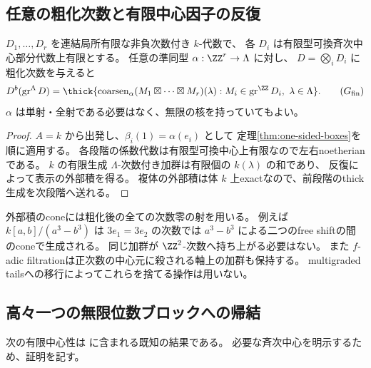 \subsection{任意の粗化次数と有限中心因子の反復}

\begin{theorem}[有限中心代数の外部積生成]\label{thm:finite-center-boxes}
 \(D_1,\ldots,D_r\) を連結局所有限な非負次数付き \(k\)-代数で、
 各 \(D_i\) は有限型可換斉次中心部分代数上有限とする。
 任意の準同型 \(\alpha:\ZZ^r\to\Lambda\) に対し、
 \(D=\bigotimes_iD_i\) に粗化次数を与えると
 \[
 D^b(\operatorname{gr}^{\Lambda}D)
 =\thick\{\operatorname{coarsen}_{\alpha}
 (M_1\boxtimes\cdots\boxtimes M_r)(\lambda):
 M_i\in\operatorname{gr}^{\ZZ}D_i,\ \lambda\in\Lambda\}.
 \tag{\(G_{\mathrm{fin}}\)}\label{eq:finite-center-generation}
 \]
 \(\alpha\) は単射・全射である必要はなく、無限の核を持っていてもよい。
\end{theorem}
\begin{proof}
 \(A=k\) から出発し、\(\beta_i(1)=\alpha(e_i)\) として
 定理\ref{thm:one-sided-boxes}を順に適用する。
 各段階の係数代数は有限型可換中心上有限なので左右noetherianである。
 \(k\) の有限生成 \(\Lambda\)-次数付き加群は有限個の \(k(\lambda)\) の和であり、
 反復によって表示の外部積を得る。
 複体の外部積は体 \(k\) 上exactなので、前段階のthick生成を次段階へ送れる。
\end{proof}

\begin{remark}[nonliftable対象と軸torsion]
 外部積のconeには粗化後の全ての次数零の射を用いる。
 例えば \(k[a,b]/(a^3-b^3)\) は \(3e_1=3e_2\) の次数では
 \(a^3-b^3\) による二つのfree shiftの間のconeで生成される。
 同じ加群が \(\ZZ^2\)-次数へ持ち上がる必要はない。
 また \(f\)-adic filtrationは正次数の中心元に殺される軸上の加群も保持する。
 multigraded tailsへの移行によってこれらを捨てる操作は用いない。
\end{remark}

\subsection{高々一つの無限位数ブロックへの帰結}

次の有限中心性は \cite[Corollary 2.3]{SmithTate} に含まれる既知の結果である。
必要な斉次中心を明示するため、証明を記す。

